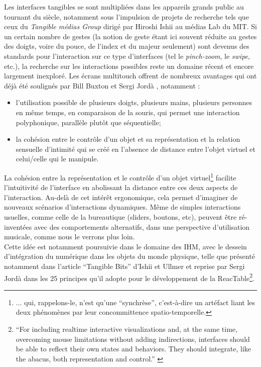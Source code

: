 \indent Les interfaces tangibles se sont multipliées dans les appareils grands public au tournant du siècle, notamment sous l'impulsion de projets de recherche tels que ceux du \textit{Tangible médias Group} dirigé par Hiroshi Ishii au médias Lab du \gls{MIT}. Si un certain nombre de gestes (la notion de geste étant ici souvent réduite au gestes des doigts, voire du pouce, de l'index et du majeur seulement) sont devenus des standards pour l'interaction sur ce type d'interfaces (tel le \textit{pinch-zoom}, le \textit{swipe}, etc.), la recherche sur les interactions possibles reste un domaine récent et encore largement inexploré. Les écrans multitouch offrent de nombreux avantages qui ont déjà été soulignés par Bill Buxton \cite{buxton_multi-touch_2007} et Sergi Jordà \cite{jorda_digital_2005}, notamment :
\vspace{-1em}
\begin{itemize}[noitemsep]
	\item l'utilisation possible de plusieurs doigts, plusieurs mains, plusieurs personnes en même temps, en comparaison de la souris, qui permet une interaction polyphonique, parallèle plutôt que séquentielle;
	\item la cohésion entre le contrôle d'un objet et sa représentation et la relation sensuelle d'intimité qui se créé en l'absence de distance entre l'objet virtuel et celui/celle qui le manipule.
\end{itemize}
\noindent La cohésion entre la représentation et le contrôle d'un objet virtuel\footnote{... qui, rappelons-le, n'est qu'une ``synchrèse'', c'est-à-dire un artéfact liant les deux phénomènes par leur concommittence spatio-temporelle.} facilite l'intuitivité de l'interface en abolissant la distance entre ces deux aspects de l'interaction. Au-delà de cet intérêt ergonomique, cela permet d'imaginer de nouveaux scénarios d'interactions dynamiques. Même de simples interactions usuelles, comme celle de la bureautique (sliders, boutons, etc), peuvent être ré-inventées avec des comportements alternatifs, dans une perspective d'utilisation musicale, comme nous le verrons plus loin.\\
\indent Cette idée est notamment poursuivie dans le domaine des \gls{IHM}, avec le dessein d'intégration du numérique dans les objets du monde physique, telle que présenté notamment dans l'article ``Tangible Bits'' d'Ishii et Ullmer \cite{ishii_tangible_1997} et reprise par Sergi Jordà dans les 25 principes qu'il adopte pour le développement de la ReacTable\footnote{``For including realtime interactive visualizations and, at the same time, overcoming
mouse limitations without adding indirections, interfaces should be able to reflect their own states and behaviors. They should integrate, like the abacus, both representation and control.'' \cite{jorda_digital_2005}}.\\
